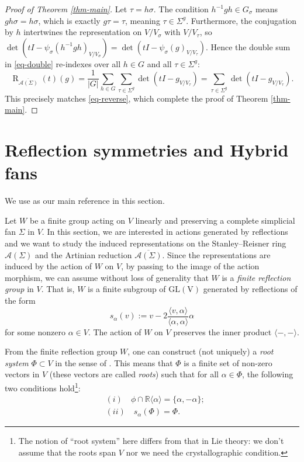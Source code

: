 \documentclass{amsart}
\theoremstyle{definition}
\theoremstyle{remark}
\numberwithin{equation}{section}
\begin{document}
\begin{proof}[Proof of Theorem \ref{thm-main}]
Let $\tau = h\sigma$. The condition $h^{-1}gh \in G_\sigma$ means $gh\sigma = h\sigma$, which is exactly $g\tau = \tau$, meaning $\tau \in \Sigma^g$. Furthermore, the conjugation by $h$ intertwines the representation on $V/V_\sigma$ with $V/V_\tau$, so $\operatorname{det}(tI - \psi_\sigma(h^{-1}gh)_{V/V_\sigma}) = \operatorname{det}(tI - \psi_\sigma(g)_{V/V_\tau})$. Hence the double sum in \eqref{eq-double} re-indexes over all $h \in G$ and all $\tau \in \Sigma^g$:
$$\operatorname{R}_{\overline{\mathcal{A}(\Sigma)}}(t)(g) = \frac{1}{|G|} \sum_{h \in G} \sum_{\tau \in \Sigma^g} \operatorname{det}(tI - g_{V/V_\tau}) = \sum_{\tau \in \Sigma^g} \operatorname{det}(tI - g_{V/V_\tau}).$$
This precisely matches \eqref{eq-reverse}, which complete the proof of Theorem \ref{thm-main}.
\end{proof}

\section{Reflection symmetries and Hybrid fans} \label{sec-ref}
We use \cite{Humphreys90} as our main reference in this section.

Let $W$ be a finite group acting on $V$ linearly and preserving a complete simplicial fan $\Sigma$ in $V$. In this section, we are interested in actions generated by reflections and we want to study the induced representations on the Stanley--Reisner ring $\mathcal{A}(\Sigma)$ and the Artinian reduction $\overline{\mathcal{A}(\Sigma)}$. Since the representations are induced by the action of $W$ on $V$, by passing to the image of the action morphism, we can assume without loss of generality that $W$ is a \emph{finite reflection group} in $V$. That is, $W$ is a finite subgroup of $\operatorname{GL(V)}$ generated by reflections of the form 
$$
s_\alpha(v):=v-2 \frac{\langle v, \alpha\rangle}{\langle\alpha, \alpha\rangle} \alpha
$$ for some nonzero $\alpha \in V$. The action of $W$ on $V$ preserves the inner product $\langle-,-\rangle$.

From the finite reflection group $W$, one can construct (not uniquely) a \emph{root system} $\Phi \subset V$ in the sense of \cite[Chapter 1]{Humphreys90}. This means that $\Phi$  is a finite set of non-zero vectors in $V$ (these vectors are called \emph{roots}) such that for all $\alpha \in \Phi$, the following two conditions hold\footnote{The notion of ``root system'' here differs from that in Lie theory: we don't assume that the roots span $V$ nor we need the crystallographic condition.}:
\begin{equation*}
\begin{aligned}
     &(i)\quad\phi \cap \mathbb{R}\langle\alpha\rangle=\{\alpha,-\alpha\}; \\
&(ii)\quad s_\alpha(\Phi)=\Phi. 
\end{aligned}
\end{equation*}
\end{document}
